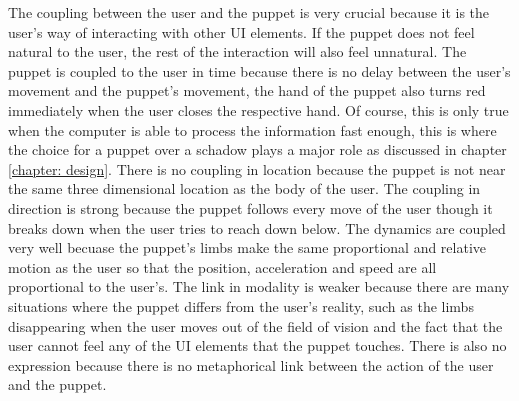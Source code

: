 The coupling between the user and the puppet is very crucial because it is the user's way of interacting with other UI elements. If the puppet does not feel natural to the user, the rest of the interaction will also  feel unnatural.  The puppet is coupled to the user in time because there is no delay between the user's movement and the puppet's movement, the hand of the puppet also turns red immediately when the user closes the respective hand. Of course, this is only true when the computer is able to process the information fast enough, this is where the choice for a puppet over a schadow plays a major role as discussed in chapter \ref{chapter: design}. There is no coupling in location because the puppet is not near the same three dimensional location as the body of the user. The coupling in direction is strong because the puppet follows every move of the user though it breaks down when the user tries to reach down below.  The dynamics are coupled very well becuase the puppet's limbs make the\textsc{} same proportional and relative motion as the user so that the position, acceleration and speed are all proportional to the user's. The link in modality is weaker because there are many situations where the puppet differs from the user's reality, such as the limbs disappearing when the user moves out of the field of vision and the fact that the user cannot feel any of the UI elements that the puppet touches. There is also no expression because there is no metaphorical link between the action of the user and the puppet.




